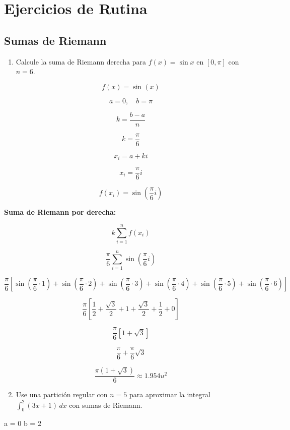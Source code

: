 \section{Ejercicios de Rutina}
\subsection*{Sumas de Riemann}

\begin{enumerate}
    \item Calcule la suma de Riemann derecha para \( f(x) = \sin x \) en \([0, \pi]\) con \( n = 6 \).
\end{enumerate}

\[
f(x) = \sin(x)
\]

\[
a = 0, \quad b = \pi
\]

\[
k = \frac{b-a}{n}
\]

\[
k = \frac{\pi}{6}
\]

\[
x_i = a + k i
\]

\[
x_i = \frac{\pi}{6} i
\]

\[
f(x_i) = \sin \left( \frac{\pi}{6} i \right)
\]

\textbf{Suma de Riemann por derecha:}

\[
k \sum_{i=1}^{n} f(x_i)
\]

\[
\frac{\pi}{6} \sum_{i=1}^{n} \sin \left(\frac{\pi}{6} i \right)
\]

\[
\frac{\pi}{6} \left[ \sin \left(\frac{\pi}{6} \cdot 1 \right) + \sin \left(\frac{\pi}{6} \cdot 2 \right) + \sin \left(\frac{\pi}{6} \cdot 3 \right) + \sin \left(\frac{\pi}{6} \cdot 4 \right) + \sin \left(\frac{\pi}{6} \cdot 5 \right) + \sin \left(\frac{\pi}{6} \cdot 6 \right) \right]
\]

\[
\frac{\pi}{6} \left[ \frac{1}{2} + \frac{\sqrt{3}}{2} + 1 + \frac{\sqrt{3}}{2} + \frac{1}{2} + 0 \right]
\]

\[
\frac{\pi}{6} \left[ 1 + \sqrt{3} \right]
\]

\[
\frac{\pi}{6} + \frac{\pi}{6} \sqrt{3}
\]

\[
\frac{\pi (1+\sqrt{3})}{6} \approx 1.954 u^2
\]

\begin{enumerate}
    \setcounter{enumi}{1}
    \item Use una partición regular con $n = 5$ para aproximar la integral $\int_{0}^{2} (3x + 1) \,dx$ con sumas de Riemann.
\end{enumerate}

a = 0 \quad b = 2

